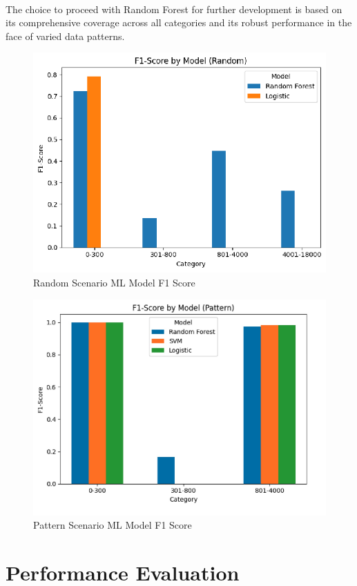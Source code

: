\documentclass[10pt]{article}
\begin{document}
\paragraph{}
The choice to proceed with Random Forest for further development is based on its comprehensive coverage across all categories and its robust performance in the face of varied data patterns. 

\begin{figure}[H]
    \centering
    \includegraphics[width=0.7\linewidth]{Random Scenario ML Model F1_Score.png}
    \caption{Random Scenario ML Model F1 Score}
    \label{fig:enter-label}
\end{figure}


\begin{figure}[H]
    \centering
    \includegraphics[width=0.75\linewidth]{Pattern Scenario ML Model F1_Score.png}
    \caption{Pattern Scenario ML Model F1 Score}
    \label{fig:enter-label}
\end{figure}



\section{Performance Evaluation}
\end{document}
